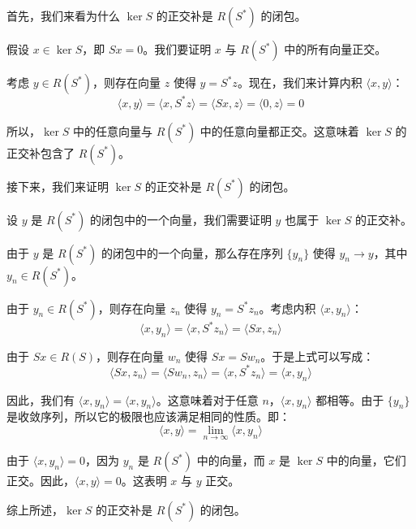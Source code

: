 首先，我们来看为什么 $\ker S$ 的正交补是 $R(S^*)$ 的闭包。

假设 $x \in \ker S$，即 $Sx = 0$。我们要证明 $x$ 与 $R(S^*)$ 中的所有向量正交。

考虑 $y \in R(S^*)$，则存在向量 $z$ 使得 $y = S^* z$。现在，我们来计算内积 $\langle x, y \rangle$：
\[\langle x, y \rangle = \langle x, S^* z \rangle = \langle Sx, z \rangle = \langle 0, z \rangle = 0\]

所以，$\ker S$ 中的任意向量与 $R(S^*)$ 中的任意向量都正交。这意味着 $\ker S$ 的正交补包含了 $R(S^*)$。

接下来，我们来证明 $\ker S$ 的正交补是 $R(S^*)$ 的闭包。

设 $y$ 是 $R(S^*)$ 的闭包中的一个向量，我们需要证明 $y$ 也属于 $\ker S$ 的正交补。

由于 $y$ 是 $R(S^*)$ 的闭包中的一个向量，那么存在序列 $\{y_n\}$ 使得 $y_n \rightarrow y$，其中 $y_n \in R(S^*)$。

由于 $y_n \in R(S^*)$，则存在向量 $z_n$ 使得 $y_n = S^* z_n$。考虑内积 $\langle x, y_n \rangle$：
\[\langle x, y_n \rangle = \langle x, S^* z_n \rangle = \langle Sx, z_n \rangle\]

由于 $Sx \in R(S)$，则存在向量 $w_n$ 使得 $Sx = Sw_n$。于是上式可以写成：
\[\langle Sx, z_n \rangle = \langle Sw_n, z_n \rangle = \langle x, S^* z_n \rangle = \langle x, y_n \rangle\]

因此，我们有 $\langle x, y_n \rangle = \langle x, y_n \rangle$。这意味着对于任意 $n$，$\langle x, y_n \rangle$ 都相等。由于 $\{y_n\}$ 是收敛序列，所以它的极限也应该满足相同的性质。即：
\[\langle x, y \rangle = \lim_{n \to \infty} \langle x, y_n \rangle\]

由于 $\langle x, y_n \rangle = 0$，因为 $y_n$ 是 $R(S^*)$ 中的向量，而 $x$ 是 $\ker S$ 中的向量，它们正交。因此，$\langle x, y \rangle = 0$。这表明 $x$ 与 $y$ 正交。

综上所述，$\ker S$ 的正交补是 $R(S^*)$ 的闭包。



